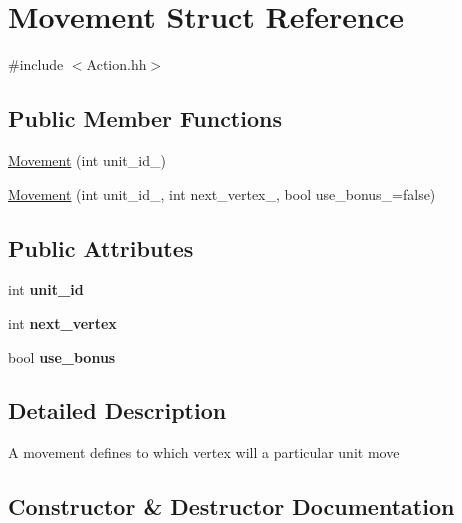 \hypertarget{structMovement}{}\section{Movement Struct Reference}
\label{structMovement}


{\ttfamily \#include $<$Action.\+hh$>$}

\subsection*{Public Member Functions}
\begin{DoxyCompactItemize}
\item 
\hyperlink{structMovement_af03c6076063f66c90b73bf355bd31c8e}{Movement} (int unit\+\_\+id\+\_\+)
\item 
\hyperlink{structMovement_a4ce04ebcb808202226ad1b8dc39cfd7d}{Movement} (int unit\+\_\+id\+\_\+, int next\+\_\+vertex\+\_\+, bool use\+\_\+bonus\+\_\+=false)
\end{DoxyCompactItemize}
\subsection*{Public Attributes}
\begin{DoxyCompactItemize}
\item 
int {\bfseries unit\+\_\+id}\hypertarget{structMovement_a306d564655c3925dd23a7e580d5131dd}{}\label{structMovement_a306d564655c3925dd23a7e580d5131dd}

\item 
int {\bfseries next\+\_\+vertex}\hypertarget{structMovement_ae3814cb508f1f9e24aceec0c27c1237f}{}\label{structMovement_ae3814cb508f1f9e24aceec0c27c1237f}

\item 
bool {\bfseries use\+\_\+bonus}\hypertarget{structMovement_a9216e78e6cb6bf8fc49223742a906e8c}{}\label{structMovement_a9216e78e6cb6bf8fc49223742a906e8c}

\end{DoxyCompactItemize}


\subsection{Detailed Description}
A movement defines to which vertex will a particular unit move 

\subsection{Constructor \& Destructor Documentation}

